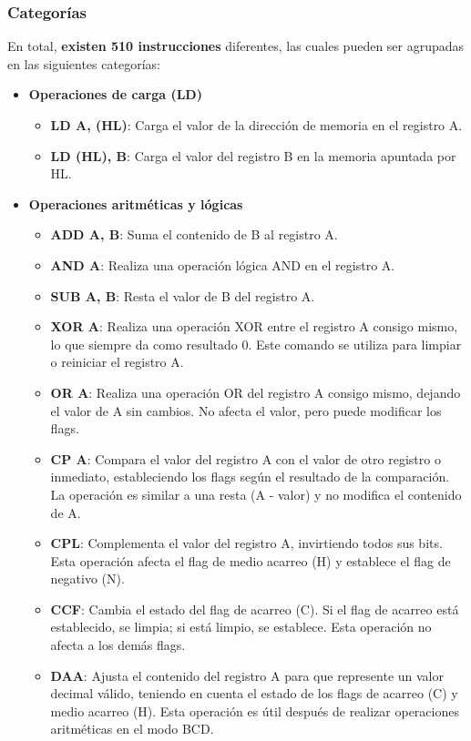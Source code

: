 \subsubsection{Categorías}

En total, \textbf{existen 510 instrucciones} diferentes, las cuales pueden ser agrupadas en las siguientes categorías:
\begin{itemize}
  \item \textbf{Operaciones de carga (LD)}
  \begin{itemize}
  \item \textbf{LD A, (HL)}: Carga el valor de la dirección de memoria en el registro A.
  \item \textbf{LD (HL), B}: Carga el valor del registro B en la memoria apuntada por HL.
  \end{itemize}
  \item \textbf{Operaciones aritméticas y lógicas}
  \begin{itemize}
  \item \textbf{ADD A, B}: Suma el contenido de B al registro A.
  \item \textbf{AND A}: Realiza una operación lógica AND en el registro A.
  \item \textbf{SUB A, B}: Resta el valor de B del registro A.
  \item \textbf{XOR A}: Realiza una operación XOR entre el registro A consigo mismo, lo que siempre da como resultado 0. Este comando se utiliza para limpiar o reiniciar el registro A.
  \item \textbf{OR A}: Realiza una operación OR del registro A consigo mismo, dejando el valor de A sin cambios. No afecta el valor, pero puede modificar los flags.
  \item \textbf{CP A}: Compara el valor del registro A con el valor de otro registro o inmediato, estableciendo los flags según el resultado de la comparación. La operación es similar a una resta (A - valor) y no modifica el contenido de A.
  \item \textbf{CPL}: Complementa el valor del registro A, invirtiendo todos sus bits. Esta operación afecta el flag de medio acarreo (H) y establece el flag de negativo (N).
  \item \textbf{CCF}: Cambia el estado del flag de acarreo (C). Si el flag de acarreo está establecido, se limpia; si está limpio, se establece. Esta operación no afecta a los demás flags.
  \item \textbf{DAA}: Ajusta el contenido del registro A para que represente un valor decimal válido, teniendo en cuenta el estado de los flags de acarreo (C) y medio acarreo (H). Esta operación es útil después de realizar operaciones aritméticas en el modo BCD.

\end{itemize}
\end{itemize}
